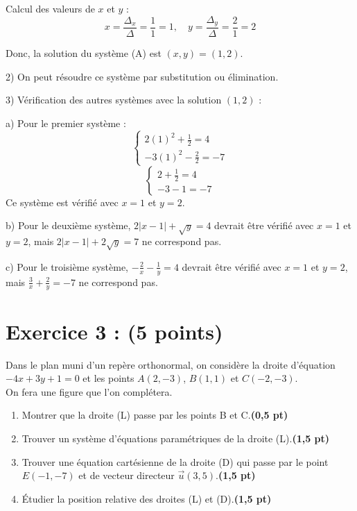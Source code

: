 \documentclass[12pt]{article}
\begin{document}
Calcul des valeurs de $x$ et $y$ :
\[
x = \frac{\Delta_x}{\Delta} = \frac{1}{1} = 1, \quad y = \frac{\Delta_y}{\Delta} = \frac{2}{1} = 2
\]

Donc, la solution du système (A) est $ (x, y) = (1, 2) $.

2) On peut résoudre ce système par substitution ou élimination.

3) Vérification des autres systèmes avec la solution $ (1, 2) $ :

a) Pour le premier système :
\[
\begin{cases}
2(1)^2 + \frac{1}{2} = 4 \\
-3(1)^2 - \frac{2}{2} = -7
\end{cases}
\]
\[
\begin{cases}
2 + \frac{1}{2} = 4 \\
-3 - 1 = -7
\end{cases}
\]
Ce système est vérifié avec $x = 1$ et $y = 2$.

b) Pour le deuxième système, $2|x - 1| + \sqrt{y} = 4$ devrait être vérifié avec $x = 1$ et $y = 2$, mais $2|x - 1| + 2\sqrt{y} = 7$ ne correspond pas.

c) Pour le troisième système, $ -\frac{2}{x} - \frac{1}{y} = 4 $ devrait être vérifié avec $x = 1$ et $y = 2$, mais $ \frac{3}{x} + \frac{2}{y} = -7 $ ne correspond pas.

\section*{Exercice 3 : (5 points)}

Dans le plan muni d’un repère orthonormal, on considère la droite d’équation \(-4x + 3y + 1 = 0\) et les points \(A(2, -3)\), \(B(1, 1)\) et \(C(-2, -3)\).\\
On fera une figure que l’on complétera.

\begin{enumerate}
    \item Montrer que la droite (L) passe par les points B et C.\textbf{(0,5 pt)}

    \item Trouver un système d’équations paramétriques de la droite (L).\textbf{(1,5 pt)}

    \item Trouver une équation cartésienne de la droite (D) qui passe par le point \(E(-1, -7)\) et de vecteur directeur \(\vec{u}(3, 5)\).\textbf{(1,5 pt)}

    \item Étudier la position relative des droites (L) et (D).\textbf{(1,5 pt)}
\end{enumerate}
\end{document}
